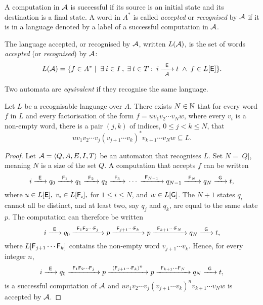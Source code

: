 A computation in ${\mathcal{A}}$ is successful if its source is an initial state and its destination is a final state. A word in $A^*$ is called \emph{accepted} or \emph{recognised} by ${\mathcal{A}}$ if it is in a language denoted by a label of a successful computation in ${\mathcal{A}}$.

\begin{defn}
    The language accepted, or recognised by ${\mathcal{A}}$, written $L({\mathcal{A}})$, is the set of words \emph{accepted} (or \emph{recognised}) by ${\mathcal{A}}$:
    \[
        L({\mathcal{A}}) = \{ f \in A^* \mid \; \exists \: i \in I \: , \; \exists \: t \in T : \: i {\; \xrightarrow[{\mathcal{A}}]{\: \; {\mathsf{E}} \: \;} \;} t \; \wedge \; f \in L[{\mathsf{E}}] \}.
    \]
\end{defn}

Two automata are \emph{equivalent} if they recognise the same language.

\begin{lemma}\label{lm:block_star_lemma}
    Let $L$ be a recognisable language over $A$. There exists $N \in \mathbb{N}$ that for every word $f$ in $L$ and every factorisation of the form $f = u v_1 v_2 \dotsm v_N w$, where every $v_i$ is a non-empty word, there is a pair $(j,k)$ of indices, $0 \leq j < k \leq N$, that
    \[
        u v_1 v_2 \dotsm v_j {(v_{j+1} \dotsm v_k)}^* v_{k+1} \dotsm v_N w \subseteq L.
    \]
\end{lemma}

\begin{proof}
    Let ${\mathcal{A}} = \langle Q, A, E, I, T \rangle$ be an automaton that recognises $L$. Set $N = |Q|$, meaning $N$ is a size of the set $Q$. A computation that accepts $f$ can be written
    \[
        i {\; \xrightarrow[]{\: \; {\mathsf{E}} \: \;} \;} q_0 {\; \xrightarrow[]{\: \; {\mathsf{F}}_1 \: \;} \;} q_1 {\; \xrightarrow[]{\: \; {\mathsf{F}}_2 \: \;} \;} q_2 {\; \xrightarrow[]{\: \; {\mathsf{F}}_3 \: \;} \;} \dotsm {\; \xrightarrow[]{\: \; {\mathsf{F}}_{N-1} \: \;} \;} q_{N-1} {\; \xrightarrow[]{\: \; {\mathsf{F}}_{N} \: \;} \;} q_N {\; \xrightarrow[]{\: \; {\mathsf{G}} \: \;} \;} t,
    \]
    where $u \in L[{\mathsf{E}}], \; v_i \in L[{\mathsf{F}}_i], $ for $ 1 \leq i \leq N$, and $w \in L[{\mathsf{G}}]$. The $N + 1$ states $q_i$ cannot all be distinct, and at least two, say $q_j$ and $q_k$, are equal to the same state $p$. The computation can therefore be written
    \[
        i {\; \xrightarrow[]{\: \; {\mathsf{E}} \: \;} \;} q_0 {\; \xrightarrow[]{\: \; {\mathsf{F}}_1 {\mathsf{F}}_2 \dotsm {\mathsf{F}}_j \: \;} \;} p {\; \xrightarrow[]{\: \; {\mathsf{F}}_{j+1} \dotsm {\mathsf{F}}_k \: \;} \;} p {\; \xrightarrow[]{\: \; {\mathsf{F}}_{k+1} \dotsm {\mathsf{F}}_N \: \;} \;} q_N {\; \xrightarrow[]{\: \; {\mathsf{G}} \: \;} \;} t,
    \]
    where $L[{\mathsf{F}}_{j+1} \dotsm {\mathsf{F}}_k]$ contains the non-empty word $v_{j+1} \dotsm v_k$. Hence, for every integer $n$,
    \[
        i {\; \xrightarrow[]{\: \; {\mathsf{E}} \: \;} \;} q_0 {\; \xrightarrow[]{\: \; {\mathsf{F}}_1 {\mathsf{F}}_2 \dotsm {\mathsf{F}}_j \: \;} \;} p {\; \xrightarrow[]{\: \; {({\mathsf{F}}_{j+1} \dotsm {\mathsf{F}}_k)}^n \: \;} \;} p {\; \xrightarrow[]{\: \; {\mathsf{F}}_{k+1} \dotsm {\mathsf{F}}_N \: \;} \;} q_N {\; \xrightarrow[]{\: \; {\mathsf{G}} \: \;} \;} t,
    \]
    is a successful computation of ${\mathcal{A}}$ and $u v_1 v_2 \dotsm v_j {(v_{j+1} \dotsm v_k)}^n v_{k+1} \dotsm v_N w$ is accepted by ${\mathcal{A}}$.
\end{proof}

